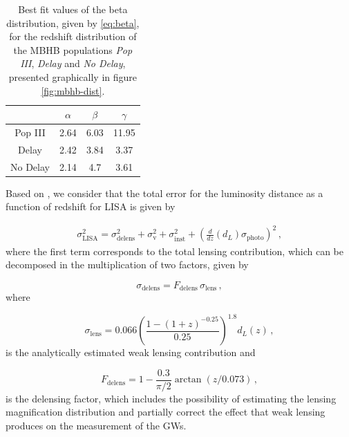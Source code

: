 \begin{table}[h!]
    \centering
    \begin{tabular}{|c|c|c|c|}
        \hline
                 & $\alpha$ & $\beta$ & $\gamma$ \\ \hline
        Pop III  & 2.64     & 6.03    & 11.95   \\ \hline
        Delay    & 2.42     & 3.84    & 3.37    \\ \hline
        No Delay & 2.14     & 4.7     & 3.61   \\ \hline
    \end{tabular}
    \caption[Best fit values for a beta distribution applied to the redshift distribution of LISA SS events.]
    {Best fit values of the beta distribution, given by \cref{eq:beta}, for the redshift distribution of the \gls{MBHB} populations \textit{Pop III}, \textit{Delay} and \textit{No Delay}, presented graphically in figure \ref{fig:mbhb-dist}.}
    \label{tab:bestfit}
\end{table}

Based on \cite{Speri2021}, we consider that the total error for the luminosity distance as a function of redshift for \gls{LISA} is given by

\begin{equation}
    \label{eq:LISA-error}
    \begin{aligned}
        \sigma^2_\text{LISA} = \sigma_{\text{delens}}^2 + \sigma_\text{v}^2 + \sigma_{\text{inst}}^2 + \left( \frac{d}{dz} (d_L) \sigma_{\text{photo}} \right)^2 \,,
    \end{aligned}
\end{equation}
where the first term corresponds to the total lensing contribution, which can be decomposed in the multiplication of two factors, given by

\begin{equation}
    \sigma_{\text{delens}} =  F_{\text{delens}} \, \sigma_{\text{lens}} \,,
\end{equation}
where

\begin{equation}
    \sigma_{\text{lens}} = 0.066 \left( \frac{1 - (1+z)^{-0.25}}{0.25} \right)^{1.8} d_L(z) \,,
\end{equation}
is the analytically estimated weak lensing contribution and

\begin{equation}
    F_{\text{delens}} = 1 - \frac{0.3}{\pi/2} \arctan{(z/0.073)} \,,
\end{equation}
is the delensing factor, which includes the possibility of estimating the lensing magnification distribution and partially correct the effect that weak lensing produces on the measurement of the \glspl{GW}.

